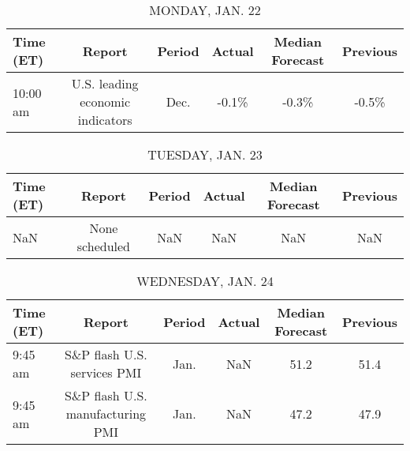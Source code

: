 \documentclass{article}%
\begin{document}
%
\normalsize%


\begin{table}[htbp]%
\caption{MONDAY, JAN. 22}%
\centering%
\begin{adjustbox}{width=1\textwidth}%
\begin{tabular}{lccccc}
\toprule
Time (ET) &                           Report & Period & Actual & Median Forecast & Previous \\
\midrule
 10:00 am & U.S. leading economic indicators &   Dec. &  -0.1\% &           -0.3\% &    -0.5\% \\
\bottomrule
\end{tabular}
%
\end{adjustbox}%
\end{table}

%


\begin{table}[htbp]%
\caption{TUESDAY, JAN. 23}%
\centering%
\begin{adjustbox}{width=1\textwidth}%
\begin{tabular}{lccccc}
\toprule
Time (ET) &         Report & Period & Actual & Median Forecast & Previous \\
\midrule
      NaN & None scheduled &    NaN &    NaN &             NaN &      NaN \\
\bottomrule
\end{tabular}
%
\end{adjustbox}%
\end{table}

%


\begin{table}[htbp]%
\caption{WEDNESDAY, JAN. 24}%
\centering%
\begin{adjustbox}{width=1\textwidth}%
\begin{tabular}{lccccc}
\toprule
Time (ET) &                           Report & Period & Actual & Median Forecast & Previous \\
\midrule
  9:45 am &      S\&P flash U.S. services PMI &   Jan. &    NaN &            51.2 &     51.4 \\
  9:45 am & S\&P flash U.S. manufacturing PMI &   Jan. &    NaN &            47.2 &     47.9 \\
\bottomrule
\end{tabular}
%
\end{adjustbox}%
\end{table}

%
\end{document}

